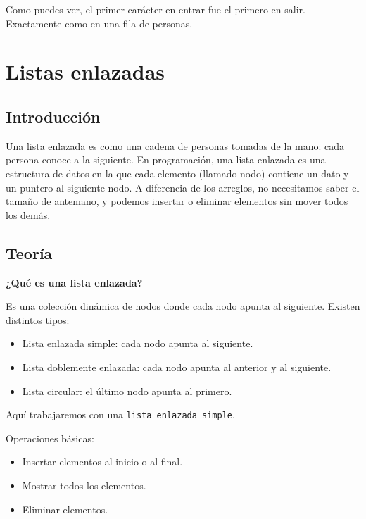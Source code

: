 \documentclass[
  11pt,
  a4paper,
  DIV=11,
  numbers=noendperiod]{scrreprt}
\providecommand{\tightlist}{%
  \setlength{\itemsep}{0pt}\setlength{\parskip}{0pt}}
\begin{document}
Como puedes ver, el primer carácter en entrar fue el primero en salir.
Exactamente como en una fila de personas.


\chapter{Listas enlazadas}\label{listas-enlazadas}

\section{Introducción}\label{introducciuxf3n-3}

Una lista enlazada es como una cadena de personas tomadas de la mano:
cada persona conoce a la siguiente. En programación, una lista enlazada
es una estructura de datos en la que cada elemento (llamado nodo)
contiene un dato y un puntero al siguiente nodo. A diferencia de los
arreglos, no necesitamos saber el tamaño de antemano, y podemos insertar
o eliminar elementos sin mover todos los demás.

\section{Teoría}\label{teoruxeda-2}

\textbf{¿Qué es una lista enlazada?}

Es una colección dinámica de nodos donde cada nodo apunta al siguiente.
Existen distintos tipos:

\begin{itemize}
\tightlist
\item
  Lista enlazada simple: cada nodo apunta al siguiente.
\item
  Lista doblemente enlazada: cada nodo apunta al anterior y al
  siguiente.
\item
  Lista circular: el último nodo apunta al primero.
\end{itemize}

Aquí trabajaremos con una \texttt{lista\ enlazada\ simple}.

Operaciones básicas:

\begin{itemize}
\tightlist
\item
  Insertar elementos al inicio o al final.
\item
  Mostrar todos los elementos.
\item
  Eliminar elementos.
\end{itemize}
\end{document}
